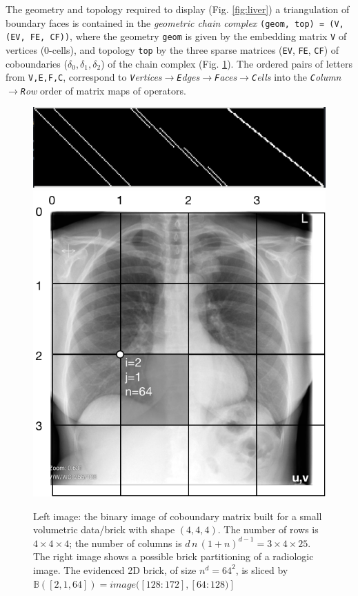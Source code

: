 \documentclass{article}
\newcommand{\E}{\mathbb{E}}
\newcommand{\B}{\mathbb{B}}
\begin{document}
The geometry and topology required to display (Fig. \ref{fig:liver}) a triangulation of boundary faces
is contained in the \emph{geometric chain complex} \texttt{(geom, top) = (V, (EV, FE, CF))},
where the geometry \texttt{geom} is given by
the embedding matrix \texttt{V} of vertices (0-cells), and  topology \texttt{top} by the three sparse matrices (\texttt{EV}, \texttt{FE}, \texttt{CF}) of coboundaries ($\delta_0, \delta_1, \delta_2$) of the chain complex (Fig. \ref{fig:boundary_matrix_4x4x4}). The ordered pairs of letters from \texttt{V,E,F,C}, correspond to \emph{\emph{\texttt{V}}ertices$\to$\emph{\texttt{E}}dges$\to$\emph{\texttt{F}}aces$\to$\emph{\texttt{C}}ells} into the 
\emph{\emph{\texttt{C}}olumn$\to$\emph{\texttt{R}}ow} order of matrix maps of operators.

\begin{figure}[tbp] %
   \centering
   \includegraphics[width=0.76\linewidth]{figs/boundary_matrix_4x4x4.pdf} 
   \includegraphics[width=0.22\linewidth]{figs/blocks} 
  \caption{
Left image: the binary image of coboundary matrix 
  built for a small volumetric data/brick with shape $(4,4,4)$. The number of rows is $4\times 4\times 4$; the number of columns is $d\,n\,(1+n)^{d-1} = 3\times 4\times 25$. \\
   The right image shows a possible brick partitioning of a radiologic image. The evidenced 2D brick, of size $n^d=64^2$, is sliced by $\B([2,1,64]) = image([128:172],[64:128)]$
   }
   \label{fig:boundary_matrix_4x4x4}
\end{figure}
\end{document}
